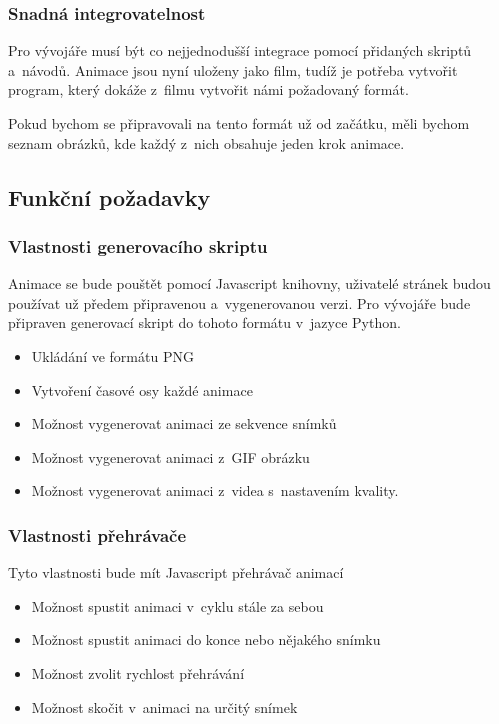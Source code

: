 \subsubsection*{Snadná integrovatelnost}

Pro vývojáře musí být co nejjednodušší integrace pomocí přidaných skriptů a~návodů. Animace jsou nyní uloženy jako film, tudíž je potřeba vytvořit program, který dokáže z~filmu vytvořit námi požadovaný formát.

Pokud bychom se připravovali na tento formát už od začátku, měli bychom seznam obrázků, kde každý z~nich obsahuje jeden krok animace.

\subsection{Funkční požadavky}

\subsubsection*{Vlastnosti generovacího skriptu}

Animace se bude pouštět pomocí Javascript knihovny, uživatelé stránek budou používat už předem připravenou a~vygenerovanou verzi. Pro vývojáře bude připraven generovací skript do tohoto formátu v~jazyce Python\cite{python}.

\begin{itemize}
\item Ukládání ve formátu PNG
\item Vytvoření časové osy každé animace
\item Možnost vygenerovat animaci ze sekvence snímků
\item Možnost vygenerovat animaci z~GIF obrázku
\item Možnost vygenerovat animaci z~videa s~nastavením kvality.
\end{itemize}

\subsubsection*{Vlastnosti přehrávače}

Tyto vlastnosti bude mít Javascript přehrávač animací

\begin{itemize}
  \item Možnost spustit animaci v~cyklu stále za sebou
  \item Možnost spustit animaci do konce nebo nějakého snímku 
  \item Možnost zvolit rychlost přehrávání
  \item Možnost skočit v~animaci na určitý snímek
  
\end{itemize}

